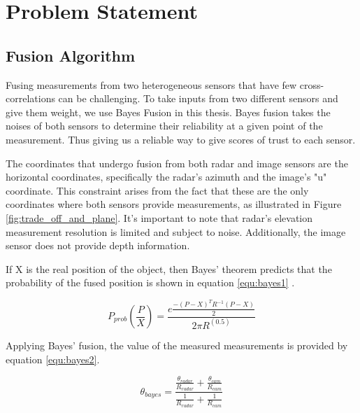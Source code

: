 

\chapter{Problem Statement}\label{chap:Problem_statement}

\section{Fusion Algorithm}\label{sec:2-bayes_fusion}
Fusing measurements from two heterogeneous sensors that have few cross-correlations can be challenging. 
To take inputs from two different sensors and give them weight, we use Bayes Fusion in this thesis.
Bayes fusion takes the noises of both sensors to determine their reliability at a given point of the measurement.
Thus giving us a reliable way to give scores of trust to each sensor.

The coordinates that undergo fusion from both radar and image sensors are the horizontal coordinates,
specifically the radar's azimuth and the image's "u" coordinate. 
This constraint arises from the fact that these are the only coordinates where both sensors provide measurements, 
as illustrated in Figure \ref{fig:trade_off_and_plane}.
It's important to note that radar's elevation measurement resolution is limited and subject to noise. 
Additionally, the image sensor does not provide depth information.

If X is the real position of the object, 
then Bayes' theorem predicts that the probability of the fused position is shown in equation \ref{equ:bayes1} \cite{10.1007/978-981-16-2248-9_32}.

\begin{equation}\label{equ:bayes1}
    P_{prob}(\frac{P}{X})=
    \frac
    {e \frac{−(P−X)^T R^{−1}(P−X)}{2}}
    {2 \pi R^(0.5)}
\end{equation}

Applying Bayes' fusion, the value of the measured measurements is provided by equation \ref{equ:bayes2}.

\begingroup
\large
\begin{equation}\label{equ:bayes2}
\theta_{bayes}=\frac
{\frac{\theta_{radar}}{R_{radar}}+\frac{\theta_{cam}} {R_{cam}}}
{\frac{1}{R_{radar}}+\frac{1}{R_{cam}}}
\end{equation}
\endgroup

